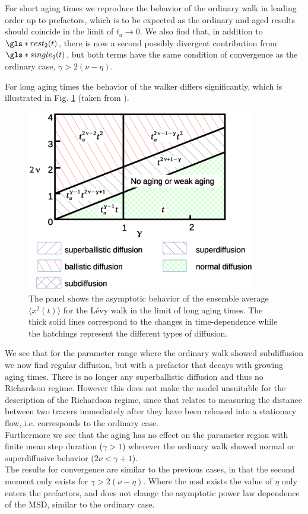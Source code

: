 For short aging times we reproduce the behavior of the ordinary walk in leading order up to prefactors, which is to be expected as the ordinary and aged results should coincide in the limit of $t_a \to 0$. We also find that, in addition to $\gls*{rest}_2(t)$, there is now a second possibly divergent contribution from $\gls*{single}_2(t)$, but both terms have the same condition of convergence as the ordinary case, $\gamma > 2(\nu-\eta)$. 

For long aging times the behavior of the walker differs significantly, which is illustrated in Fig. \ref{fig:resultsMSDaged} (taken from 
\cite{bothe}). 
%
\begin{figure}[h!]
\begin{center}
\includegraphics[width=100mm]{pics/resultsMSDaged.eps}
\caption{The panel shows the asymptotic behavior of the ensemble average $\langle x^2(t) \rangle$ for the L\'evy walk in the limit of long aging times. The thick solid lines correspond to the changes in time-dependence while the hatchings represent the different types of diffusion.
\label{fig:resultsMSDaged} }
\end{center}
\end{figure} 
%
We see that for the parameter range where the ordinary walk showed subdiffusion we now find regular diffusion, but with a prefactor that decays with growing aging times. There is no longer any superballistic diffusion and thus no Richardson regime. However this does not make the model unsuitable for the description of the Richardson regime, since that relates to measuring the distance between two tracers immediately after they have been released into a stationary flow, i.e. corresponds to the ordinary case.\\ 
Furthermore we see that the aging has no effect on the parameter region with finite mean step duration ($\gamma>1$)  wherever the ordinary walk showed normal or superdiffusive behavior ($2\nu < \gamma +1$).\\
The results for convergence are similar to the previous cases, in that the second moment only exists for $\gamma>2(\nu-\eta)$. Where the \gls*{msd} exists the value of $\eta$ only enters the prefactors, and does not change the asymptotic power law dependence of the MSD, similar to the ordinary case.

